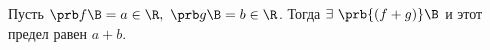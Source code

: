 \label{prbsum}
 Пусть $\prb f\B=a\in\R,\ \prb g\B=b\in\R$. Тогда $\exists\  \prb {(f+g)}\B$ и этот предел равен $a+b$.
 